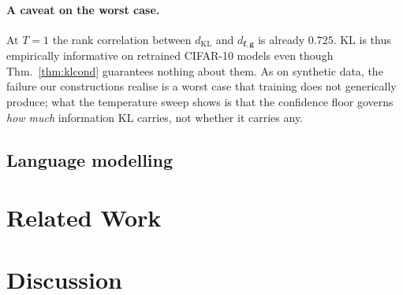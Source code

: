 \documentclass[10pt,letterpaper,twocolumn]{article}
\newcommand{\TODO}[1]{}
\newcommand{\bff}{\mathbf{f}}
\newcommand{\bfg}{\mathbf{g}}
\newcommand{\dKL}{d_{\mathrm{KL}}}
\newcommand{\dfg}{d_{\bff,\bfg}}
\theoremstyle{plain}
\theoremstyle{definition}
\theoremstyle{remark}
\begin{document}
\paragraph{A caveat on the worst case.}
At $T=1$ the rank correlation between $\dKL$ and $\dfg$ is already $0.725$.
KL is thus empirically informative on retrained CIFAR-10 models even though
Thm.~\ref{thm:klcond} guarantees nothing about them. As on synthetic data, the failure our constructions realise is a worst
case that training does not generically produce; what the temperature sweep
shows is that the confidence floor governs \emph{how much} information KL
carries, not whether it carries any.

\subsection{Language modelling}
\TODO{Optional. Small tied-embedding transformer. Drop if week~10 is tight; the
paper stands without it, but it closes the gap between the stated motivation and
the evidence.}

\section{Related Work}
\TODO{Four short paragraphs: (i) representational similarity measures and their
invariances; (ii) linear identifiability for this model family; (iii)
robustness of identifiability under approximate likelihood maximisation,
including $\varepsilon$-non-identifiability; (iv) R\'enyi and max-divergence
outside this setting, where max-divergence is already the standard tool for
worst-case ratio control. Point (iv) is a real connection, not decoration.}

\section{Discussion}
\label{sec:discussion}
\end{document}
